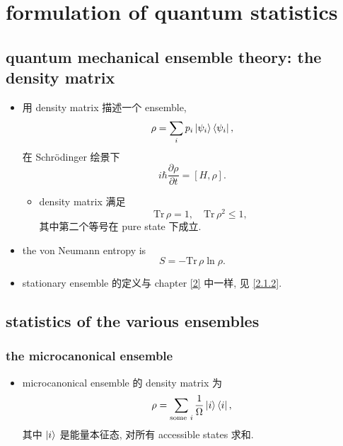 \chapter{formulation of quantum statistics}
\section{quantum mechanical ensemble theory: the density matrix}
\begin{itemize}
	\item 用 density matrix 描述一个 ensemble,
	\begin{equation}
		\rho = \sum_i p_i \ket{\psi_i} \bra{\psi_i},
	\end{equation}
	在 Schrödinger 绘景下
	\begin{equation}
		i \hbar \frac{\partial \rho}{\partial t} = [H, \rho].
	\end{equation}
	\begin{itemize}
		\item density matrix 满足
		\begin{equation}
			\mathrm{Tr} \, \rho = 1, \quad \mathrm{Tr} \, \rho^2 \leq 1,
		\end{equation}
		其中第二个等号在 pure state 下成立.
	\end{itemize}
	
	\item the von Neumann entropy is
	\begin{equation}
		S = - \mathrm{Tr} \, \rho \ln \rho.
	\end{equation}
	
	\item stationary ensemble 的定义与 chapter \ref{2} 中一样, 见 \eqref{2.1.2}.
\end{itemize}

\section{statistics of the various ensembles}
\subsection{the microcanonical ensemble}
\begin{itemize}
	\item microcanonical ensemble 的 density matrix 为
	\begin{equation}
		\rho = \sum_{\text{some} \ i} \frac{1}{\Omega} \ket{i} \bra{i},
	\end{equation}
	其中 $\ket{i}$ 是能量本征态, 对所有 accessible states 求和.
\end{itemize}

